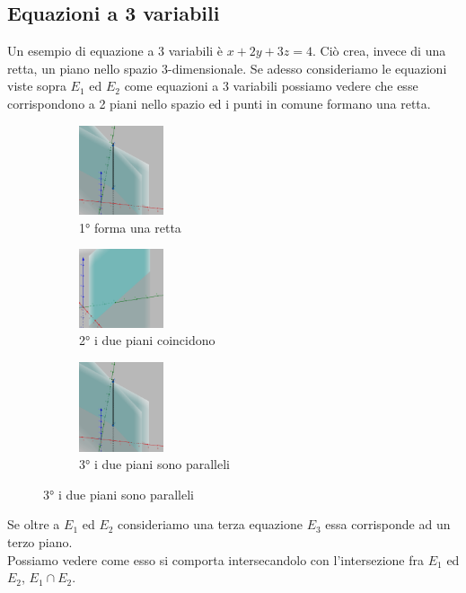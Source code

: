 \subsection{Equazioni a 3 variabili}
Un esempio di equazione a 3 variabili è $x + 2y + 3z = 4$. Ciò crea, invece di una retta, un piano nello spazio 3-dimensionale.
Se adesso consideriamo le equazioni viste sopra $E_1$ ed $E_2$ come equazioni a 3 variabili possiamo vedere che esse corrispondono a 2 piani nello spazio ed i punti in comune formano una retta.\\
\begin{figure}[h!]
    \centering
    \begin{subfigure}{.3\textwidth}
        \centering
        \includegraphics[width=2.5cm]{images/piani-incidenti.png}
        \caption{1° forma una retta}
    \end{subfigure}
    \begin{subfigure}{.3\textwidth}
        \centering
        \includegraphics[width=2.5cm]{images/piani-coincidenti.png}
        \caption{2° i due piani coincidono}
    \end{subfigure}
    \begin{subfigure}{.3\textwidth}
        \centering
        \includegraphics[width=2.5cm]{images/piani-incidenti.png}
        \caption{3° i due piani sono paralleli}
    \end{subfigure}
\end{figure}
Se oltre a $E_1$ ed $E_2$ consideriamo una terza equazione $E_3$ essa corrisponde ad un terzo piano. \\
Possiamo vedere come esso si comporta intersecandolo con l'intersezione fra $E_1$ ed $E_2$, $E_1 \cap E_2$.
